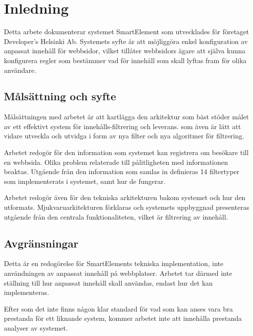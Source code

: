 \section{Inledning}

Detta arbete dokumenterar systemet SmartElement som utvecklades för företaget Developer’s Helsinki Ab. Systemets syfte är att möjliggöra enkel konfiguration av anpassat innehåll för webbsidor, vilket tillåter webbsidors ägare att själva kunna konfigurera regler som bestämmer vad för innehåll som skall lyftas fram för olika användare.

\subsection{Målsättning och syfte}

Målsättningen med arbetet är att kartlägga den arkitektur som bäst stöder målet av ett effektivt system för innehålls-filtrering och leverans. som även är lätt att vidare utveckla och utvidga i form av nya filter och nya algoritmer för filtrering.

Arbetet redogör för den information som systemet kan registrera om besökare till en webbsida. Olika problem relaterade till pålitligheten med informationen beaktas. Utgående från den information som samlas in definieras 14 filtertyper som implementerats i systemet, samt hur de fungerar. 

Arbetet redogör även för den tekniska arkitekturen bakom systemet och hur den utformats. Mjukvaruarkitekturen förklaras och systemets uppbyggnad presenteras utgående från den centrala funktionaliteten, vilket är filtrering av innehåll.

\subsection{Avgränsningar}

Detta är en redogörelse för SmartElements tekniska implementation, inte användningen av anpassat innehåll på webbplatser. Arbetet tar därmed inte ställning till hur anpassat innehåll skall användas, endast hur det kan implementeras.

Efter som det inte finns någon klar standard för vad som kan anses vara bra prestanda för ett liknande system, kommer arbetet inte att innehålla prestanda analyser av systemet.

